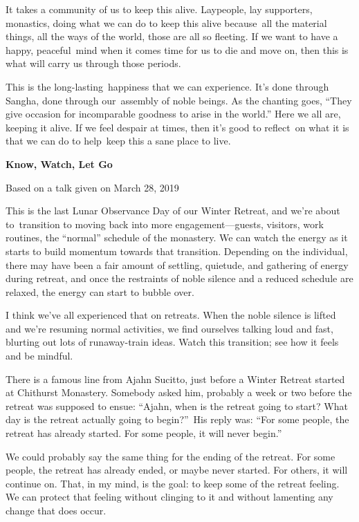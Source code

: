 It takes a community of us to keep this alive. Laypeople, lay supporters, monastics, doing what we can do to keep this alive because~all the material things, all the ways of the world, those are all so fleeting. If we want to have a happy, peaceful~mind when it comes time for us to die and move on, then this is what will carry us through those periods.

This is the long-lasting~happiness that we can experience. It's done through Sangha, done through our~assembly of noble beings. As the chanting goes, ``They give occasion for incomparable goodness to arise in the world.'' Here we all are, keeping it alive. If we feel despair at times, then it's good to reflect~on what it is that we can do to help~keep this a sane place to live.~

\textbf{Know, Watch, Let Go}

Based on a talk given on March 28, 2019

This is the last Lunar Observance Day of our Winter Retreat, and we're about to~transition to moving back into more engagement---guests, visitors, work routines, the ``normal'' schedule of the monastery. We can watch the energy as it starts to build momentum towards that transition. Depending on the individual, there may have been a fair amount of settling, quietude, and gathering of energy during retreat, and once the restraints of noble silence and a reduced schedule are relaxed, the energy can start to bubble over.

I think we've all experienced that on retreats. When the noble silence is lifted and we're resuming normal activities, we find ourselves talking loud and fast, blurting out lots of runaway-train ideas. Watch this transition; see how it feels and be mindful.

There is a famous line from Ajahn Sucitto, just before a Winter Retreat started at Chithurst Monastery. Somebody asked him, probably a week or two before the retreat was supposed to ensue: ``Ajahn, when is the retreat going to start? What day is the retreat actually going to begin?''~His reply was: ``For some people, the retreat has already started. For some people, it will never begin.''~

We could probably say the same thing for the ending of the retreat. For some people, the retreat has already ended, or maybe never started. For others, it will continue on. That, in my mind, is the goal: to keep some of the retreat feeling. We can protect that feeling without clinging to it and without lamenting any change that does occur.~

